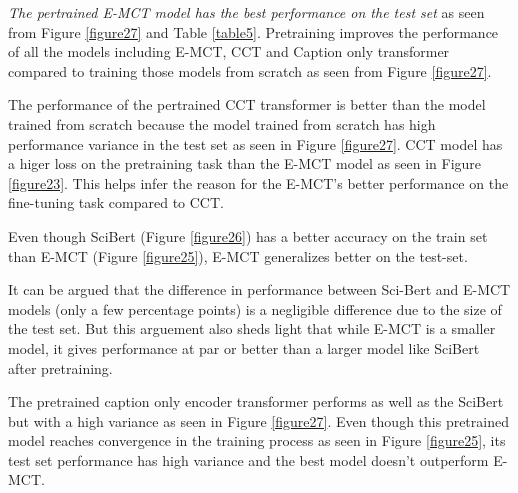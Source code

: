 \textit{The pertrained E-MCT model has the best performance on the test set} as seen from Figure \ref{figure27} and Table \ref{table5}. Pretraining improves the performance of all the models including E-MCT, CCT and Caption only transformer compared to training those models from scratch as seen from Figure \ref{figure27}. 

The performance of the pertrained CCT transformer is better than the model trained from scratch because the model trained from scratch has high performance variance in the test set as seen in Figure \ref{figure27}. CCT model has a higer loss on the pretraining task than the E-MCT model as seen in Figure \ref{figure23}. This helps infer the reason for the E-MCT's better performance on the fine-tuning task compared to CCT. 

Even though SciBert (Figure \ref{figure26}) has a better accuracy on the train set than E-MCT (Figure \ref{figure25}), E-MCT generalizes better on the test-set.

It can be argued that the difference in performance between Sci-Bert and E-MCT models (only a few percentage points) is a negligible difference due to the size of the test set. But this arguement also sheds light that while E-MCT is a smaller model, it gives performance at par or better than a larger model like SciBert after pretraining. 

The pretrained caption only encoder transformer performs as well as the SciBert but with a high variance as seen in Figure \ref{figure27}. Even though this pretrained model reaches convergence in the training process as seen in Figure \ref{figure25}, its test set performance has high variance and the best model doesn't outperform E-MCT. 
